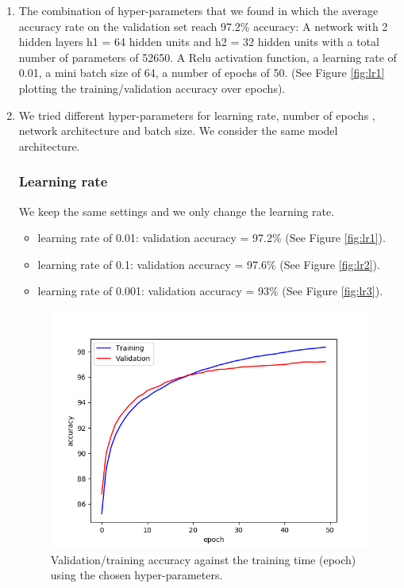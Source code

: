 \documentclass[a4paper]{article}
\begin{document}
\begin{enumerate}

\item
The combination of hyper-parameters that we found in which the average accuracy rate on the validation set reach 97.2\% accuracy:
A network with 2 hidden layers h1 = 64 hidden units and h2 = 32 hidden units with a total number of parameters of 52650. A Relu activation function, a learning rate of 0.01, a mini batch size of 64, a number of epochs of 50. (See Figure \ref{fig:lr1} plotting the training/validation accuracy over epochs).

\item 
We tried different hyper-parameters for learning rate, number of epochs {\color{red}{Number of epochs is not an hyperparameter, see slack channel tp1 01/29}}, network architecture and batch size. We consider the same model architecture.

\subsubsection{Learning rate}

We keep the same settings and we only change the learning rate.

\begin{itemize}

\item learning rate of 0.01: validation accuracy = 97.2\% (See Figure \ref{fig:lr1}).

\item learning rate of 0.1: validation accuracy = 97.6\% (See Figure \ref{fig:lr2}).

\item learning rate of 0.001: validation accuracy = 93\% (See Figure \ref{fig:lr3}).  
  
\end{itemize}

\begin{figure}
\centering
\includegraphics[width=1\textwidth]{acc_hyper.png}
\caption{\label{fig:hyper}Validation/training accuracy against the training time (epoch) using the chosen hyper-parameters.}
\end{figure}


\end{enumerate}
\end{document}
